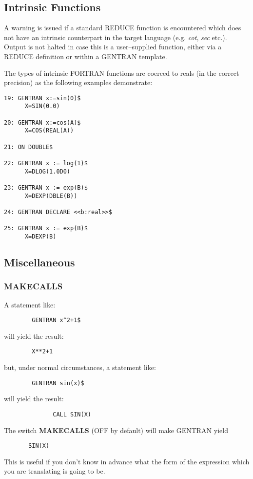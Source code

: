 \subsection{Intrinsic Functions}
\label{intrinsic} 
A warning is issued if a standard REDUCE function is encountered which
does not have an intrinsic counterpart in the target language (e.g.
 {\it cot\/},
{\it sec\/} etc.).
Output is not halted in case this is a user--supplied function, either via
a REDUCE definition or within a GENTRAN template.

The types of intrinsic FORTRAN functions are coerced to reals (in the correct
precision) as the following examples demonstrate:
\begin{verbatim}
19: GENTRAN x:=sin(0)$
      X=SIN(0.0)

20: GENTRAN x:=cos(A)$
      X=COS(REAL(A))

21: ON DOUBLE$

22: GENTRAN x := log(1)$
      X=DLOG(1.0D0)

23: GENTRAN x := exp(B)$
      X=DEXP(DBLE(B))

24: GENTRAN DECLARE <<b:real>>$

25: GENTRAN x := exp(B)$
      X=DEXP(B)

\end{verbatim}

\subsection{Miscellaneous}

\subsubsection{MAKECALLS}
A statement like:
\begin{verbatim}
        GENTRAN x^2+1$
\end{verbatim}
will yield the result:
\begin{verbatim}
        X**2+1
\end{verbatim}
but, under normal circumstances, a statement like:
\begin{verbatim}
        GENTRAN sin(x)$
\end{verbatim}
will yield the result:
\begin{verbatim}
              CALL SIN(X)
\end{verbatim}
The switch {\bf MAKECALLS} (OFF by default) will make GENTRAN yield
\begin{verbatim}
       SIN(X)
\end{verbatim}
This is useful if you don't know in advance what the form of the expression
which you are translating is going to be.

